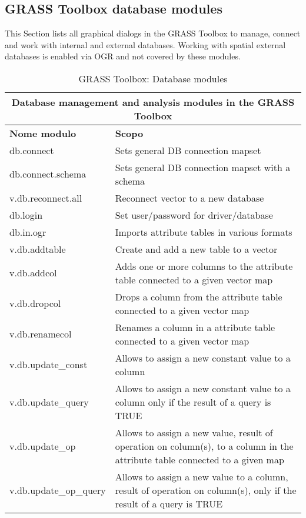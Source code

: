 \subsection{GRASS Toolbox database modules}

This Section lists all graphical dialogs in the GRASS Toolbox to manage, 
connect and work with internal and external databases. Working with spatial 
external databases is enabled via OGR and not covered by these modules.

\begin{table}[ht]
\centering
\caption{GRASS Toolbox: Database modules}\medskip
 \begin{tabular}{|p{4cm}|p{12cm}|}
  \hline \multicolumn{2}{|c|}{\textbf{Database management and analysis modules in the GRASS
  Toolbox}} \\
  \hline \textbf{Nome modulo} & \textbf{Scopo} \\
  \hline db.connect & Sets general DB connection mapset \\
  \hline db.connect.schema & Sets general DB connection mapset with a schema \\
  \hline v.db.reconnect.all & Reconnect vector to a new database \\
  \hline db.login & Set user/password for driver/database \\
  \hline db.in.ogr & Imports attribute tables in various formats \\
  \hline v.db.addtable & Create and add a new table to a vector \\
  \hline v.db.addcol & Adds one or more columns to the attribute table
  connected to a given vector map \\
  \hline v.db.dropcol & Drops a column from the attribute table connected to
  a given vector map\\
  \hline v.db.renamecol & Renames a column in a attribute table connected to
  a given vector map\\
  \hline v.db.update\_const & Allows to assign a new constant value to a
  column \\
  \hline v.db.update\_query & Allows to assign a new constant value to a
  column only if the result of a query is TRUE \\
  \hline v.db.update\_op & Allows to assign a new value, result of operation
  on column(s), to a column in the attribute table connected to a given map\\
  \hline v.db.update\_op\_query & Allows to assign a new value to a column,
  result of operation on column(s), only if the result of a query is TRUE \\

\end{tabular}
\end{table}
